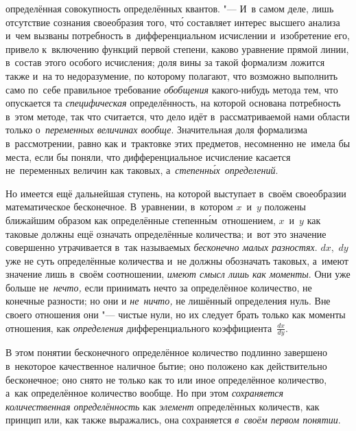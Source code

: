 определённая совокупность определённых квантов. "--- И~в самом деле, лишь
отсутствие сознания своеобразия того, чт\'{о} составляет интерес высшего анализа
и~чем вызваны потребность в~дифференциальном исчислении и~изобретение его,
привело к~включению функций первой степени, каково уравнение прямой линии,
в~состав этого особого исчисления; доля вины за такой формализм ложится также
и~на то недоразумение, по которому полагают, что возможно выполнить само
по~себе правильное требование {\em обобщения} какого-нибудь метода тем, что
опускается та {\em специфическая} определённость, на которой основана
потребность в~этом методе, так что считается, что дело идёт в~рассматриваемой
нами области только о~{\em переменных величинах вообще}. Значительная доля
формализма в~рассмотрении, равно как и~трактовке этих предметов, несомненно
не~имела бы места, если бы поняли, что дифференциальное исчисление касается
не~переменных величин как таковых, а~{\em степенн\'{ы}х~определений}.

Но имеется ещё дальнейшая ступень, на которой выступает в~своём своеобразии
математическое бесконечное. В~уравнении, в~котором $x$~и~$y$ положены ближайшим
образом как определённые степенн\'{ы}м~отношением, $x$~и~$y$ как
таковые должны ещё означать определённые количества; и~вот это
значение совершенно утрачивается в~так называемых
{\em бесконечно малых разностях}. $dx$,~$dy$ уже не суть определённые
количества и~не должны обозначать таковых, а~имеют значение лишь в~своём
соотношении, {\em имеют смысл лишь как моменты}. Они уже больше
не~{\em нечто,} если принимать нечто за определённое количество, не конечные
разности; но они и {\em не~ничто,} не лишённый определения нуль. Вне своего
отношения они "--- чистые нули, но их следует брать только как моменты
отношения, как {\em определения} дифференциального
коэффициента~$\frac{dx}{dy}$.

В этом понятии бесконечного определённое количество подлинно завершено
в~некоторое качественное наличное бытие; оно положено как действительно
бесконечное; оно снято не только как то или иное определённое количество,
а~как определённое количество вообще. Но при этом
{\em сохраняется количественная определённость} как {\em элемент}
определённых количеств, как принцип или, как также выражались,
она сохраняется {\em в~своём первом понятии}.

